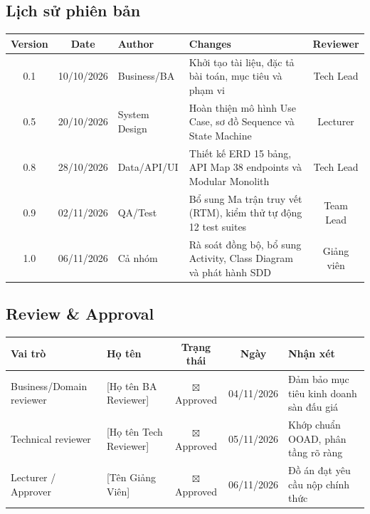 \documentclass[11pt,a4paper]{article}
\begin{document}
\subsection{Lịch sử phiên bản}
\begin{table}[H]
    \centering
    \small
    \begin{tabularx}{\textwidth}{|c|c|l|X|c|}
        \hline
        \textbf{Version} & \textbf{Date} & \textbf{Author} & \textbf{Changes} & \textbf{Reviewer} \\ \hline
        0.1 & 10/10/2026 & Business/BA & Khởi tạo tài liệu, đặc tả bài toán, mục tiêu và phạm vi & Tech Lead \\ \hline
        0.5 & 20/10/2026 & System Design & Hoàn thiện mô hình Use Case, sơ đồ Sequence và State Machine & Lecturer \\ \hline
        0.8 & 28/10/2026 & Data/API/UI & Thiết kế ERD 15 bảng, API Map 38 endpoints và Modular Monolith & Tech Lead \\ \hline
        0.9 & 02/11/2026 & QA/Test & Bổ sung Ma trận truy vết (RTM), kiểm thử tự động 12 test suites & Team Lead \\ \hline
        1.0 & 06/11/2026 & Cả nhóm & Rà soát đồng bộ, bổ sung Activity, Class Diagram và phát hành SDD & Giảng viên \\ \hline
    \end{tabularx}
\end{table}

\subsection{Review \& Approval}
\begin{table}[H]
    \centering
    \small
    \begin{tabularx}{\textwidth}{|l|l|c|c|X|}
        \hline
        \textbf{Vai trò} & \textbf{Họ tên} & \textbf{Trạng thái} & \textbf{Ngày} & \textbf{Nhận xét} \\ \hline
        Business/Domain reviewer & [Họ tên BA Reviewer] & $\boxtimes$ Approved & 04/11/2026 & Đảm bảo mục tiêu kinh doanh sàn đấu giá \\ \hline
        Technical reviewer & [Họ tên Tech Reviewer] & $\boxtimes$ Approved & 05/11/2026 & Khớp chuẩn OOAD, phân tầng rõ ràng \\ \hline
        Lecturer / Approver & [Tên Giảng Viên] & $\boxtimes$ Approved & 06/11/2026 & Đồ án đạt yêu cầu nộp chính thức \\ \hline
    \end{tabularx}
\end{table}
\end{document}
